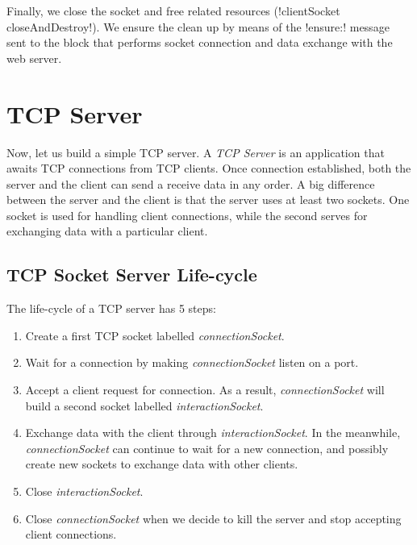 \documentclass[a4paper,10pt,twoside]{book}
\begin{document}
Finally, we  close the socket and free related resources (\ct!clientSocket closeAndDestroy!).
We ensure the clean up by means of the \ct!ensure:! message sent to the block that performs socket connection and data exchange with the web server.

\section{TCP Server}
\label{sec:serverTcpSocket}
Now, let us build a simple TCP server. A \textit{TCP Server} is an application that awaits TCP connections from TCP clients. Once connection established, both the server and the client can send a receive data in any order. 
A big difference between the server and the client is that the server uses at least two sockets.
One socket is used for handling client connections, while the second serves for exchanging data with a particular client. 


\subsection{TCP Socket Server Life-cycle}
The life-cycle of a TCP server has 5 steps:
\begin{enumerate}
\item Create a first TCP socket labelled \textit{connectionSocket}.
\item Wait for a connection by making \textit{connectionSocket} listen on a port.
\item Accept a client request for connection. As a result, \textit{connectionSocket} will build a second socket labelled \textit{interactionSocket}.
\item Exchange data with the client through \textit{interactionSocket}. In the meanwhile, \textit{connectionSocket} can continue to wait for a new connection, and possibly create new sockets to exchange data with other clients. 
\item Close \textit{interactionSocket}.
\item Close \textit{connectionSocket} when we decide to kill the server and stop accepting client connections.
\end{enumerate}
\end{document}
